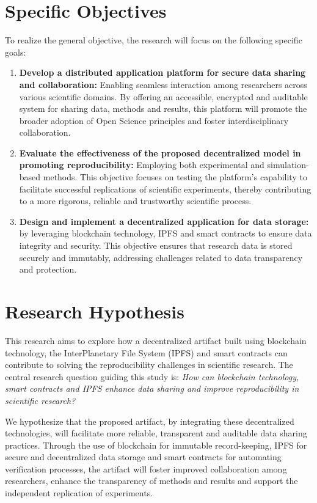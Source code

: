 \documentclass{article}
\begin{document}
\section{Specific Objectives}

To realize the general objective, the research will focus on the following specific goals:

\begin{enumerate}
    \item \textbf{Develop a distributed application platform for secure data sharing and collaboration:} Enabling seamless interaction among researchers across various scientific domains. By offering an accessible, encrypted and auditable system for sharing data, methods and results, this platform will promote the broader adoption of Open Science principles and foster interdisciplinary collaboration.

    \item \textbf{Evaluate the effectiveness of the proposed decentralized model in promoting reproducibility:} Employing both experimental and simulation-based methods. This objective focuses on testing the platform's capability to facilitate successful replications of scientific experiments, thereby contributing to a more rigorous, reliable and trustworthy scientific process.

    \item \textbf{Design and implement a decentralized application for data storage:} by leveraging blockchain technology, IPFS and smart contracts to ensure data integrity and security. This objective ensures that research data is stored securely and immutably, addressing challenges related to data transparency and protection.
\end{enumerate}

\section{Research Hypothesis}

This research aims to explore how a decentralized artifact built using blockchain technology, the  InterPlanetary File System (IPFS) and smart contracts can contribute to solving the reproducibility challenges in scientific research. The central research question guiding this study is: \textit{How can blockchain technology, smart contracts and IPFS enhance data sharing and improve reproducibility in scientific research?}

We hypothesize that the proposed artifact, by integrating these decentralized technologies, will facilitate more reliable, transparent and auditable data sharing practices. Through the use of blockchain for immutable record-keeping, IPFS for secure and decentralized data storage and smart contracts for automating verification processes, the artifact will foster improved collaboration among researchers, enhance the transparency of methods and results and support the independent replication of experiments.
\end{document}

